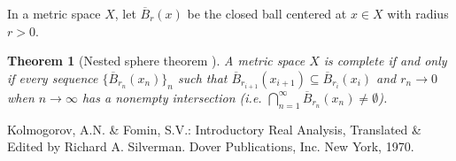 \documentclass[12pt]{article}
\newtheorem{thm}{Theorem}
\begin{document}
In a metric space $X$, let $\overline{B}_{r}(x)$ be the closed
 ball centered at $x\in X$ with radius $r>0$.
\begin{thm}[Nested sphere theorem \cite{KF}]
A metric space $X$ is complete if and only if every sequence $\{\overline B_{r_n}(x_n)\}_n$ such that $\overline B_{r_{i+1}}(x_{i+1}) \subseteq \overline B_{r_i}(x_i)$ and $r_n \to 0$ when $n \to \infty$ has a nonempty intersection \textit{(i.e. $\bigcap_{n=1}^{\infty}\overline B_{r_n}(x_n) \neq \emptyset$)}.
\end{thm}

\begin{thebibliography}{1}
 Kolmogorov, A.N. \& Fomin, S.V.: Introductory Real Analysis, Translated \& Edited by Richard A. Silverman.  Dover Publications, Inc. New York, 1970.
\end{thebibliography}
\end{document}
